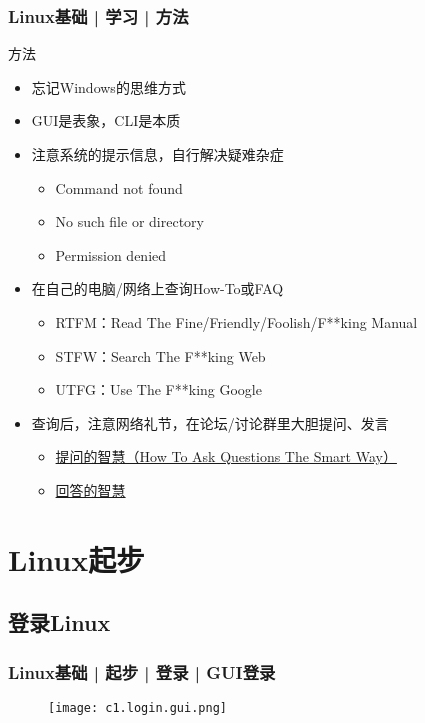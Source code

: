 \begin{frame}
  \frametitle{Linux基础 | 学习 | 方法}
  \begin{block}{方法}
    \begin{itemize}[<+->]
      \item 忘记Windows的思维方式 
      \item GUI是表象，CLI是本质
      \item 注意系统的提示信息，自行解决疑难杂症
      \begin{itemize}
        \item Command not found
        \item No such file or directory
        \item Permission denied
      \end{itemize}
      \item 在自己的电脑/网络上查询How-To或FAQ
      \begin{itemize}
        \item RTFM：Read The Fine/Friendly/Foolish/F**king Manual
        \item STFW：Search The F**king Web
        \item UTFG：Use The F**king Google
      \end{itemize}
      \item 查询后，注意网络礼节，在论坛/讨论群里大胆提问、发言
      \begin{itemize}
        \item \href{http://www.wapm.cn/smart-questions/smart-questions-zh.html}{提问的智慧（How To Ask Questions The Smart Way）}
        \item \href{http://code.google.com/p/cpyug/wiki/ZenForAsk}{回答的智慧}
      \end{itemize}
    \end{itemize}
  \end{block}
\end{frame}

\section{Linux起步}
\subsection{登录Linux}
\begin{frame}
  \frametitle{Linux基础 | 起步 | 登录 | GUI登录}
  \begin{figure}
    \centering
    \texttt{[image: c1.login.gui.png]}
  \end{figure}
\end{frame}

